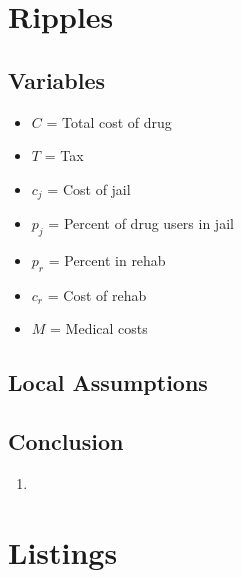 \documentclass[12pt,letterpaper]{article}
\begin{document}
\section{Ripples}

\subsection{Variables}

\begin{itemize}[label=]
  \item $C$ = Total cost of drug
  \item $T$ = Tax
  \item $c_j$ = Cost of jail
  \item $p_j$ = Percent of drug users in jail
  \item $p_r$ = Percent in rehab
  \item $c_r$ = Cost of rehab
  \item $M$ = Medical costs
\end{itemize}

\subsection{Local Assumptions}

\subsection{Conclusion}

\begin{enumerate}
  \item
\end{enumerate}


\newpage
\printbibliography
% 
\newpage

\appendix
\listoffigures
\listoftables

\section{Listings}
\end{document}
